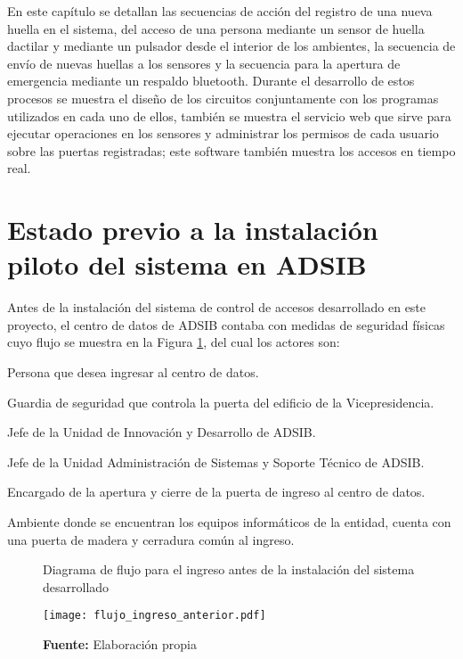 \documentclass[../principal]{subfiles}
\begin{document}
\espacio

  En este capítulo se detallan las secuencias de acción del registro de una nueva huella en el sistema, del acceso de una persona mediante un sensor de huella dactilar y mediante un pulsador desde el interior de los ambientes, la secuencia de envío de nuevas huellas a los sensores y la secuencia para la apertura de emergencia mediante un respaldo bluetooth. Durante el desarrollo de estos procesos se muestra el diseño de los circuitos conjuntamente con los programas utilizados en cada uno de ellos, también se muestra el servicio web que sirve para ejecutar operaciones en los sensores y administrar los permisos de cada usuario sobre las puertas registradas; este software también muestra los accesos en tiempo real.

  \section{Estado previo a la instalación piloto del sistema en ADSIB}

  Antes de la instalación del sistema de control de accesos desarrollado en este proyecto, el centro de datos de ADSIB contaba con medidas de seguridad físicas cuyo flujo se muestra en la Figura \ref{fig:flujo_ingreso_anterior}, del cual los actores son:
  \begin{description}[align=left]
    \item[Usuario:] Persona que desea ingresar al centro de datos.
    \item[Policía:] Guardia de seguridad que controla la puerta del edificio de la Vicepresidencia.
    \item[Jefe UID:] Jefe de la Unidad de Innovación y Desarrollo de ADSIB.
    \item[Jefe UADSST:] Jefe de la Unidad Administración de Sistemas y Soporte Técnico de ADSIB.
    \item[Encargado:] Encargado de la apertura y cierre de la puerta de ingreso al centro de datos.
    \item[Centro de datos:] Ambiente donde se encuentran los equipos informáticos de la entidad, cuenta con una puerta de madera y cerradura común al ingreso.
  \end{description}

  \begin{figure}[H]
    \centering
    \caption{Diagrama de flujo para el ingreso antes de la instalación del sistema desarrollado}
    \texttt{[image: flujo\_ingreso\_anterior.pdf]}
    \caption*{\textbf{Fuente:} Elaboración propia}
    \label{fig:flujo_ingreso_anterior}
  \end{figure}
\end{document}
